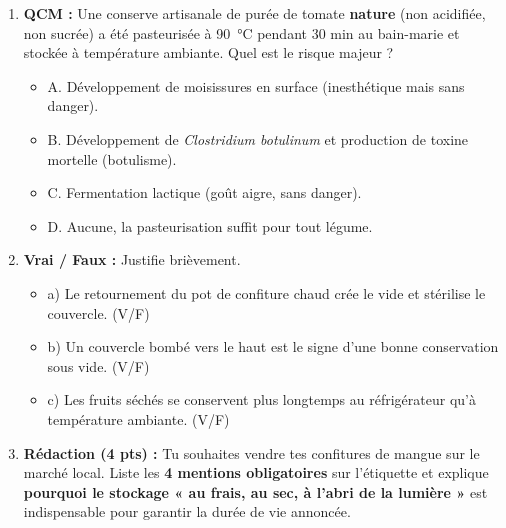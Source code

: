 \documentclass[11pt]{article}
\begin{document}
\begin{exercice}
\begin{enumerate}
    \item \textbf{QCM :} Une conserve artisanale de purée de tomate \textbf{nature} (non acidifiée, non sucrée) a été pasteurisée à \SI{90}{\celsius} pendant 30 min au bain-marie et stockée à température ambiante. Quel est le risque majeur ?
    \begin{itemize}
        \item A. Développement de moisissures en surface (inesthétique mais sans danger).
        \item B. Développement de \emph{Clostridium botulinum} et production de toxine mortelle (botulisme).
        \item C. Fermentation lactique (goût aigre, sans danger).
        \item D. Aucune, la pasteurisation suffit pour tout légume.
    \end{itemize}
    \item \textbf{Vrai / Faux :} Justifie brièvement.
    \begin{itemize}
        \item a) Le retournement du pot de confiture chaud crée le vide et stérilise le couvercle. (V/F)
        \item b) Un couvercle bombé vers le haut est le signe d'une bonne conservation sous vide. (V/F)
        \item c) Les fruits séchés se conservent plus longtemps au réfrigérateur qu'à température ambiante. (V/F)
    \end{itemize}
    \item \textbf{Rédaction (4 pts) :} Tu souhaites vendre tes confitures de mangue sur le marché local. Liste les \textbf{4 mentions obligatoires} sur l'étiquette et explique \textbf{pourquoi le stockage « au frais, au sec, à l'abri de la lumière »} est indispensable pour garantir la durée de vie annoncée.
\end{enumerate}
\end{exercice}
\end{document}
